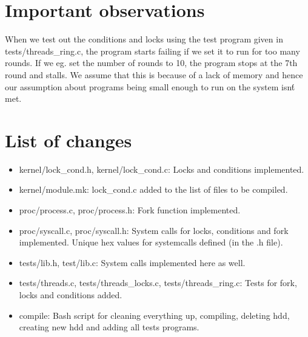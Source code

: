 \documentclass[11pt,a4paper]{article}
\begin{document}
\section{Important observations}
When we test out the conditions and locks using the test program given in
tests/threads\_ring.c, the program starts failing if we set it to run for too
many rounds. If we eg. set the number of rounds to 10, the program stops at the
7th round and stalls. We assume that this is because of a lack of memory and
hence our assumption about programs being small enough to run on the system
isn\'t met.

\section{List of changes}

\begin{itemize}
\item kernel/lock\_cond.h, kernel/lock\_cond.c: Locks and conditions
implemented.
\item kernel/module.mk: lock\_cond.c added to the list of files to be compiled.
\item proc/process.c, proc/process.h: Fork function implemented.
\item proc/syscall.c, proc/syscall.h: System calls for locks, conditions and
fork implemented. Unique hex values for systemcalls defined (in the .h file).
\item tests/lib.h, test/lib.c: System calls implemented here as well.
\item tests/threads.c, tests/threads\_locks.c, tests/threads\_ring.c: Tests for
fork, locks and conditions added.
\item compile: Bash script for cleaning everything up, compiling, deleting hdd,
creating new hdd and adding all tests programs.
\end{itemize}
\end{document}
